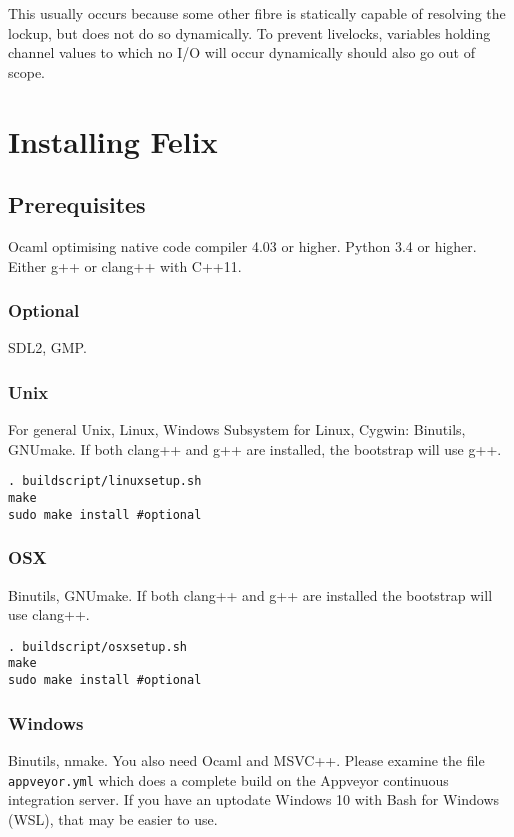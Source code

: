 \documentclass[oneside]{book}
\begin{document}
This usually occurs because some other fibre is statically
capable of resolving the lockup, but does not do so 
dynamically. To prevent livelocks, variables holding
channel values to which no I/O will occur dynamically
should also go out of scope.

\chapter{Installing Felix}
\section{Prerequisites}
Ocaml optimising native code compiler 4.03 or higher.
Python 3.4 or higher. Either g++ or clang++ with C++11.

\subsection{Optional}
SDL2, GMP.

\subsection{Unix}
For general Unix, Linux, Windows Subsystem for Linux, Cygwin:
Binutils, GNUmake. If both clang++ and g++ are installed,
the bootstrap will use g++.

\begin{verbatim}
. buildscript/linuxsetup.sh
make
sudo make install #optional
\end{verbatim}

\subsection{OSX}
Binutils, GNUmake. If both clang++ and g++ are installed
the bootstrap will use clang++.

\begin{verbatim}
. buildscript/osxsetup.sh
make
sudo make install #optional
\end{verbatim}

\subsection{Windows}
Binutils, nmake. You also need Ocaml and MSVC++.
Please examine the file \verb$appveyor.yml$ which does
a complete build on the Appveyor continuous integration
server. If you have an uptodate Windows 10 with Bash for
Windows (WSL), that may be easier to use.

\clearpage
{}
{}
\listoflistings
%
\clearpage
{}
\printindex[codeindex] 
%
\clearpage
{}
\printindex
%
\end{document}
